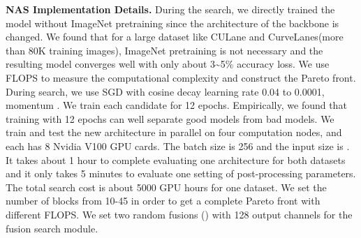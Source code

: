 \documentclass[runningheads]{llncs}
\begin{document}
\textbf{NAS Implementation Details.} 
During the search, we directly trained the model without ImageNet
pretraining since the architecture of the backbone is changed. We
found that for a large dataset like CULane and CurveLanes(more than
80K training images), ImageNet pretraining is not necessary and the
resulting model converges well with only about 3\textasciitilde 5\%
accuracy loss. We use FLOPS to measure the computational complexity and construct the Pareto front.
During search, we use SGD with cosine decay learning
rate 0.04 to 0.0001, momentum . We train each candidate for
12 epochs. Empirically, we found that training with 12 epochs can
well separate good models from bad models. We train and test the new
architecture in parallel on four computation nodes, and each has 8
Nvidia V100 GPU cards. The batch size is 256 and the input size is
. It takes about 1 hour to complete evaluating one
architecture for both datasets and it only takes 5 minutes to evaluate
one setting of post-processing parameters. The total search cost is
about 5000 GPU hours for one dataset. We set the number of blocks
from 10-45 in order to get a complete Pareto front with different
FLOPS. We set two random fusions () with 128 output channels
for the fusion search module.
\end{document}
